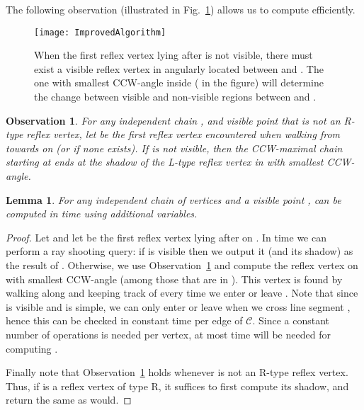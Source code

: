 \documentclass[a4paper]{article}
\newtheorem{lemma}{Lemma}
\newtheorem{observation}{Observation}
\newcommand{\C}{\ensuremath{{\mathcal C}}}
\begin{document}
The following observation (illustrated in Fig.~\ref{fig:ImprovedAlgorithm}) allows us to compute  efficiently. 

\begin{figure}[tb]
  \centering
\texttt{[image: ImprovedAlgorithm]}
\caption {\small When the first reflex vertex  lying after  is not visible, there must exist a visible reflex vertex in  angularly located between  and . The one with smallest CCW-angle inside  ( in the figure) will determine the change between visible and non-visible regions between  and .}
\label{fig:ImprovedAlgorithm}
\end{figure}








\begin{observation}\label{obs:SmallestAngle}
For any independent chain , and visible point  that is not an R-type reflex vertex, let  be the first reflex vertex encountered when walking from  towards  on  (or  if none exists). If  is not visible, then the CCW-maximal chain starting at  ends at the shadow of the L-type reflex vertex in  with smallest CCW-angle.
\end{observation}

\begin{lemma}\label{lem_next}
For any independent chain  of  vertices and a visible point , \linebreak can be computed in  time using  additional variables.
\end{lemma}
\begin{proof}
Let  and let  be the first reflex vertex lying after  on .
In  time we can perform a ray shooting query: if  is visible then we output it (and its shadow) as the result of . Otherwise, we use Observation~\ref{obs:SmallestAngle} and compute the reflex vertex on  with smallest CCW-angle (among those that are in ). This vertex is found by walking along  and keeping track of every time we enter or leave . Note that since  is visible and  is simple, we can only enter or leave  when we cross line segment , hence this can be checked in constant time per edge of \C. Since a constant number of operations is needed per vertex, at most  time will be needed for computing . 

Finally note that Observation~\ref{obs:SmallestAngle}  holds whenever  is not an R-type reflex vertex. Thus, if  is a reflex vertex of type R, it suffices to first compute its shadow, and  return the same as   would.
\end{proof}
\end{document}
